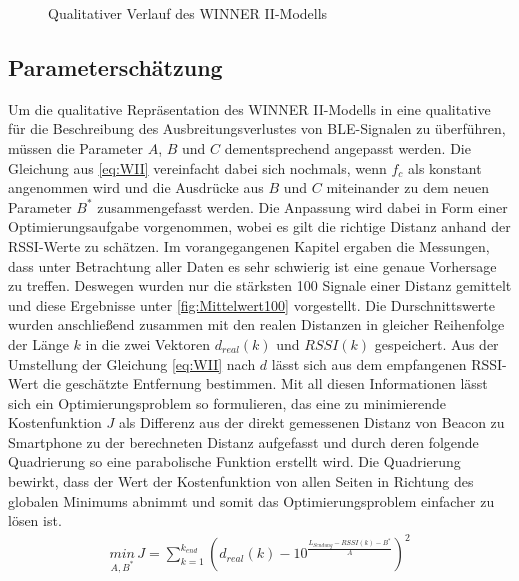 \begin{figure}[H]
\centering
{}
\caption{Qualitativer Verlauf des WINNER II-Modells}
\label{fig:QualiWII}
\end{figure}
\subsection{Parameterschätzung}
Um die qualitative Repräsentation des WINNER II-Modells in eine qualitative für die Beschreibung des Ausbreitungsverlustes von BLE-Signalen zu überführen, müssen die Parameter $A$, $B$ und $C$ dementsprechend angepasst werden. Die Gleichung aus \ref{eq:WII} vereinfacht dabei sich nochmals, wenn $f_c$ als konstant angenommen wird und die Ausdrücke aus $B$ und $C$ miteinander zu dem neuen Parameter $B^{\ast}$ zusammengefasst werden. Die Anpassung wird dabei in Form einer Optimierungsaufgabe vorgenommen, wobei es gilt die richtige Distanz anhand der RSSI-Werte zu schätzen. Im vorangegangenen Kapitel ergaben die Messungen, dass unter Betrachtung aller Daten es sehr schwierig ist eine genaue Vorhersage zu treffen. Deswegen wurden nur die stärksten 100 Signale einer Distanz gemittelt und diese Ergebnisse unter \ref{fig:Mittelwert100} vorgestellt. Die Durschnittswerte wurden anschließend zusammen mit den realen Distanzen in gleicher Reihenfolge der Länge $k$ in die zwei Vektoren $d_{real}\left ( k \right )$ und $RSSI\left ( k \right )$ gespeichert. Aus der Umstellung der Gleichung \ref{eq:WII} nach $d$ lässt sich aus dem empfangenen RSSI-Wert die geschätzte Entfernung bestimmen. Mit all diesen Informationen lässt sich ein Optimierungsproblem so formulieren, das eine zu minimierende Kostenfunktion $J$ als Differenz aus der direkt gemessenen Distanz von Beacon zu Smartphone zu der berechneten Distanz aufgefasst und durch deren folgende Quadrierung so eine parabolische Funktion erstellt wird. Die Quadrierung bewirkt, dass der Wert der Kostenfunktion von allen Seiten in Richtung des globalen Minimums abnimmt und somit das Optimierungsproblem einfacher zu lösen ist. 
\begin{align}
\underset{A,B^{\ast}}{min}\, J=\sum_{k=1}^{k_{end}}\left ( d_{real}\left ( k \right ) -10^{\frac{L_{Sendung} - RSSI\left ( k \right ) - B^{\ast}}{A}} \right )^{2} \label{eq:WIIOpti}
\end{align}
